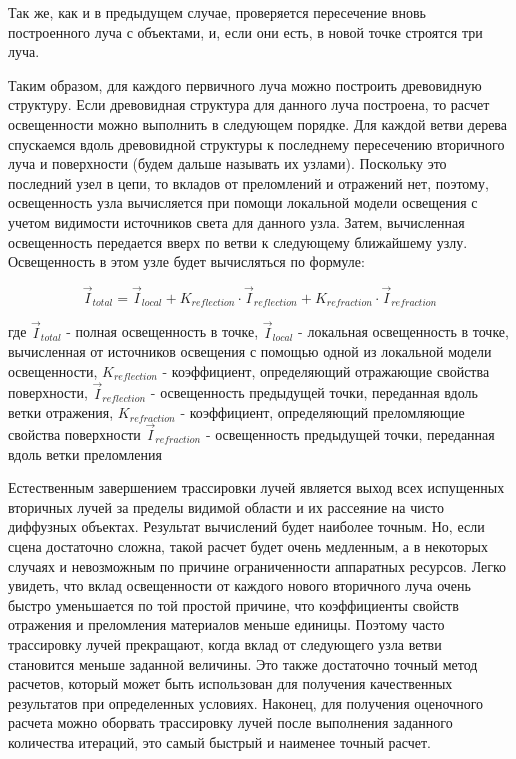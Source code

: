 \documentclass[12pt, a4paper, utf8]{article}
\begin{document}
Так же, как и в предыдущем случае, проверяется пересечение вновь построенного луча с объектами, и, если они есть, в новой точке строятся три луча.

Таким образом, для каждого первичного луча можно построить древовидную структуру. Если древовидная структура для данного луча построена, то расчет освещенности можно выполнить в следующем порядке. Для каждой ветви дерева спускаемся вдоль древовидной структуры к последнему пересечению вторичного луча и поверхности (будем дальше называть их узлами). Поскольку это последний узел в цепи, то  вкладов от преломлений и отражений нет, поэтому, освещенность узла вычисляется при помощи локальной модели освещения с учетом видимости источников света для данного узла. Затем, вычисленная освещенность передается вверх по ветви к следующему ближайшему узлу. Освещенность в этом узле будет вычисляться по формуле:

$$
 \vec{I}_{total} = \vec{I}_{local} + K_{reflection} \cdot \vec{I}_{reflection} + K_{refraction} \cdot \vec{I}_{refraction}
$$

где $\vec{I}_{total}$ - полная освещенность в точке, $\vec{I}_{local}$ - локальная освещенность в точке, вычисленная от источников освещения с помощью одной из локальной модели освещенности, $K_{reflection}$ - коэффициент, определяющий отражающие свойства поверхности, $\vec{I}_{reflection}$ - освещенность предыдущей точки, переданная вдоль ветки отражения, $K_{refraction}$ - коэффициент, определяющий преломляющие свойства поверхности $\vec{I}_{refraction}$ - освещенность предыдущей точки, переданная вдоль ветки преломления

Естественным завершением трассировки лучей является выход всех испущенных вторичных лучей за пределы видимой области и их рассеяние на чисто диффузных объектах. Результат вычислений будет наиболее точным. Но, если сцена достаточно сложна, такой расчет будет очень медленным, а в некоторых случаях и невозможным по причине ограниченности аппаратных ресурсов. Легко увидеть, что вклад освещенности от каждого нового вторичного луча очень быстро уменьшается по той простой причине, что коэффициенты свойств отражения и преломления материалов меньше единицы. Поэтому часто трассировку лучей прекращают, когда вклад от следующего узла ветви становится меньше заданной величины. Это также достаточно точный метод расчетов, который может быть использован для получения качественных результатов при определенных условиях. Наконец, для получения оценочного расчета можно оборвать трассировку лучей после выполнения заданного количества итераций, это самый быстрый и наименее точный расчет.
\end{document}
